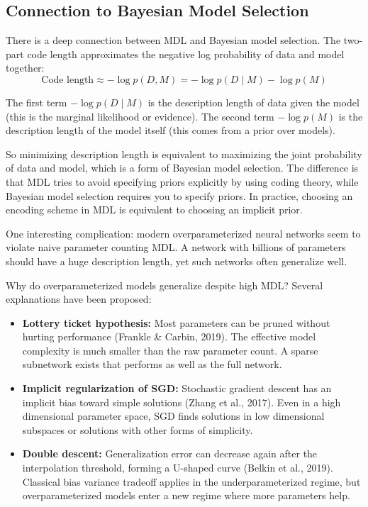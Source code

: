 \vspace{1.5em}

\subsection{Connection to Bayesian Model Selection}

There is a deep connection between MDL and Bayesian model selection. The two-part code length approximates the negative log probability of data and model together:
\begin{equation}
\text{Code length} \approx -\log p(D, M) = -\log p(D \mid M) - \log p(M)
\end{equation}

The first term $-\log p(D \mid M)$ is the description length of data given the model (this is the marginal likelihood or evidence). The second term $-\log p(M)$ is the description length of the model itself (this comes from a prior over models).

So minimizing description length is equivalent to maximizing the joint probability of data and model, which is a form of Bayesian model selection. The difference is that MDL tries to avoid specifying priors explicitly by using coding theory, while Bayesian model selection requires you to specify priors. In practice, choosing an encoding scheme in MDL is equivalent to choosing an implicit prior.

One interesting complication: modern overparameterized neural networks seem to violate naive parameter counting MDL. A network with billions of parameters should have a huge description length, yet such networks often generalize well. 

Why do overparameterized models generalize despite high MDL? Several explanations have been proposed:

\begin{itemize}
\item \textbf{Lottery ticket hypothesis:} Most parameters can be pruned without hurting performance (Frankle \& Carbin, 2019). The effective model complexity is much smaller than the raw parameter count. A sparse subnetwork exists that performs as well as the full network.

\item \textbf{Implicit regularization of SGD:} Stochastic gradient descent has an implicit bias toward simple solutions (Zhang et al., 2017). Even in a high dimensional parameter space, SGD finds solutions in low dimensional subspaces or solutions with other forms of simplicity.

\item \textbf{Double descent:} Generalization error can decrease again after the interpolation threshold, forming a U-shaped curve (Belkin et al., 2019). Classical bias variance tradeoff applies in the underparameterized regime, but overparameterized models enter a new regime where more parameters help.
\end{itemize}

